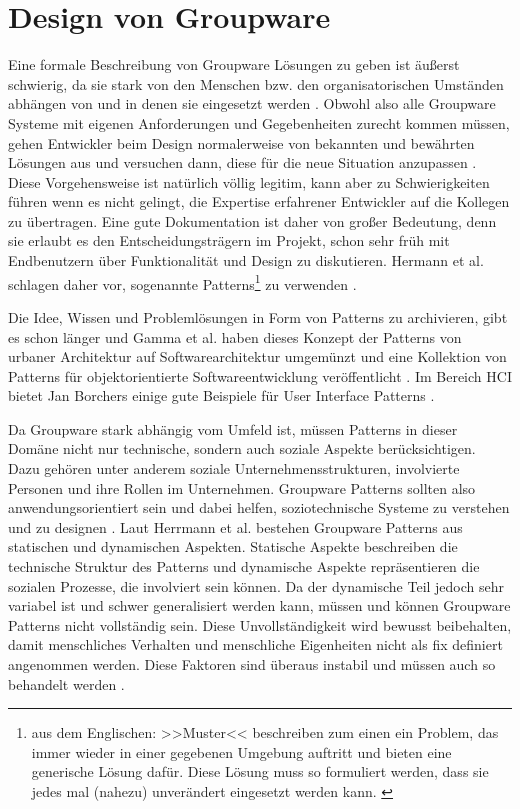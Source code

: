 \section{Design von Groupware} 

Eine formale Beschreibung von Groupware Lösungen zu geben ist äußerst schwierig, da sie stark von den Menschen bzw. den organisatorischen Umständen abhängen von und in denen sie eingesetzt werden \citep{Suchman:1995}. Obwohl also alle Groupware Systeme mit eigenen Anforderungen und Gegebenheiten zurecht kommen müssen, gehen Entwickler beim Design normalerweise von bekannten und bewährten Lösungen aus und versuchen dann, diese für die neue Situation anzupassen \citep{Herrmann:2003}. Diese Vorgehensweise ist natürlich völlig legitim, kann aber zu Schwierigkeiten führen wenn es nicht gelingt, die Expertise erfahrener Entwickler auf die Kollegen zu übertragen. Eine gute Dokumentation ist daher von großer Bedeutung, denn sie erlaubt es den Entscheidungsträgern im Projekt, schon sehr früh mit Endbenutzern über Funktionalität und Design zu diskutieren. Hermann et al. schlagen daher vor, sogenannte Patterns\footnote{aus dem Englischen: >>Muster<< beschreiben zum einen ein Problem, das immer wieder in einer gegebenen Umgebung auftritt und bieten eine generische Lösung dafür. Diese Lösung muss so formuliert werden, dass sie jedes mal (nahezu) unverändert eingesetzt werden kann. \citep{Herrmann:2003}} zu verwenden \citep{Herrmann:2003}. 

\medskip Die Idee, Wissen und Problemlösungen in Form von Patterns zu archivieren, gibt es schon länger und Gamma et al. haben dieses Konzept der Patterns von urbaner Architektur auf Softwarearchitektur umgemünzt und eine Kollektion von Patterns für objektorientierte Softwareentwicklung veröffentlicht \citep{Gamma:1995}. Im Bereich \ac{HCI} bietet Jan Borchers einige gute Beispiele für User Interface Patterns \citep{Borchers:2000}.

\medskip Da Groupware stark abhängig vom Umfeld ist, müssen Patterns in dieser Domäne nicht nur technische, sondern auch soziale Aspekte berücksichtigen. Dazu gehören unter anderem soziale Unternehmensstrukturen, involvierte Personen und ihre Rollen im Unternehmen. Groupware Patterns sollten also anwendungsorientiert sein und dabei helfen, soziotechnische Systeme zu verstehen und zu designen \citep{Herrmann:2003, Eason:1988}. Laut Herrmann et al. bestehen Groupware Patterns aus statischen und dynamischen Aspekten. Statische Aspekte beschreiben die technische Struktur des Patterns und dynamische Aspekte repräsentieren die sozialen Prozesse, die involviert sein können. Da der dynamische Teil jedoch sehr variabel ist und schwer generalisiert werden kann, müssen und können Groupware Patterns nicht vollständig sein. Diese Unvollständigkeit wird bewusst beibehalten, damit menschliches Verhalten und menschliche Eigenheiten nicht als fix definiert angenommen werden. Diese Faktoren sind überaus instabil und müssen auch so behandelt werden \citep{Herrmann:2003}.

